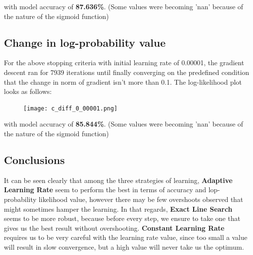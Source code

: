 \documentclass[a4paper]{article}
\begin{document}
\noindent with model accuracy of \textbf{87.636\%}. (Some values were becoming 'nan' because of the nature of the sigmoid function)
\vskip 0.1in

\subsection*{Change in log-probability value}
For the above stopping criteria with initial learning rate of 0.00001, the gradient descent ran for 7939 iterations until finally converging on the predefined condition that the change in norm of gradient isn't more than 0.1. The log-likelihood plot looks as follows:

\break
\begin{figure}[h!]
\centering
\texttt{[image: c\_diff\_0\_00001.png]}
\end{figure}

\noindent with model accuracy of \textbf{85.844\%}. (Some values were becoming 'nan' because of the nature of the sigmoid function)
\vskip 0.1in

\subsection*{Conclusions}
It can be seen clearly that among the three strategies of learning, \textbf{Adaptive Learning Rate} seem to perform the best in terms of accuracy and lop-probability likelihood value, however there may be few overshoots observed that might sometimes hamper the learning. In that regards, \textbf{Exact Line Search} seems to be more robust, because before every step, we ensure to take one that gives us the best result without overshooting. \textbf{Constant Learning Rate} requires us to be very careful with the learning rate value, since too small a value will result in slow convergence, but a high value will never take us the optimum.
\end{document}
